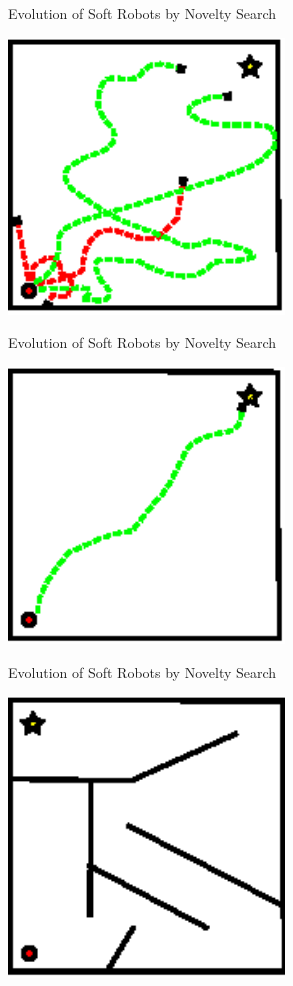 \documentclass[6pt]{beamer}
\begin{document}
\begin{frame}{{\scriptsize Evolution of Soft Robots by} Novelty Search}
\begin{center}
\includegraphics[width=0.55\textwidth]{../Figures/Misc/mazeEasy6.eps}
\end{center}
\end{frame}

\begin{frame}{{\scriptsize Evolution of Soft Robots by} Novelty Search}
\begin{center}
\includegraphics[width=0.55\textwidth]{../Figures/Misc/mazeEasy7.eps}
\end{center}
\end{frame}

\begin{frame}{{\scriptsize Evolution of Soft Robots by} Novelty Search}
\begin{center}
\includegraphics[width=0.55\textwidth]{../Figures/Misc/maze.eps}
\end{center}
\end{frame}
\end{document}
